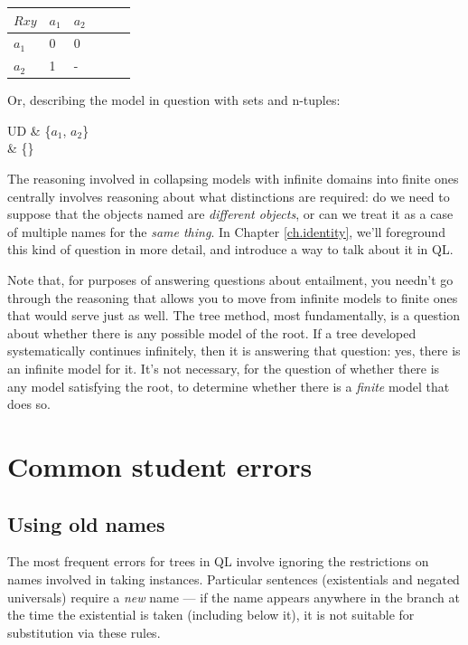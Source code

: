 \begin{table}[h!]
\centering
\begin{tabular}{l|lllll}
$Rxy$   & $a_{1}$ & $a_{2}$ \\ \hline
$a_{1}$   & 0 & 0   \\
$a_{2}$   & 1 & - \\
\end{tabular}
\end{table}

Or, describing the model in question with sets and n-tuples:


\begin{partialmodel}
	UD & \{$a_{1}$, $a_{2}$\}\\
	 & \{\}
\end{partialmodel}


The reasoning involved in collapsing models with infinite domains into finite ones centrally involves reasoning about what distinctions are required: do we need to suppose that the objects named are \emph{different objects}, or can we treat it as a case of multiple names for the \emph{same thing}. In Chapter \ref{ch.identity}, we'll foreground this kind of question in more detail, and introduce a way to talk about it in QL.

Note that, for purposes of answering questions about entailment, you needn't go through the reasoning that allows you to move from infinite models to finite ones that would serve just as well. The tree method, most fundamentally, is a question about whether there is any possible model of the root. If a tree developed systematically continues infinitely, then it is answering that question: yes, there is an infinite model for it. It's not necessary, for the question of whether there is any model satisfying the root, to determine whether there is a \emph{finite} model that does so.

\section{Common student errors}

\subsection{Using old names}

The most frequent errors for trees in QL involve ignoring the restrictions on names involved in taking instances. Particular sentences (existentials and negated universals) require a \emph{new} name --- if the name appears anywhere in the branch at the time the existential is taken (including below it), it is not suitable for substitution via these rules.

